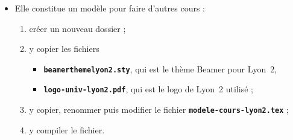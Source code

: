   \begin{itemize}
  \item Elle constitue un modèle pour faire d'autres cours :
    
    \begin{enumerate}
    \item créer un nouveau dossier ;
    \item y copier les fichiers 
      
      \begin{itemize}
      \item \texttt{\textbf{beamerthemelyon2.sty}}, qui est le thème Beamer pour Lyon~2,
      \item \texttt{\textbf{logo-univ-lyon2.pdf}}, qui est le logo de Lyon~2 utilisé ;
      \end{itemize}
      
    \item y copier, renommer puis modifier le fichier \texttt{\textbf{modele-cours-lyon2.tex}} ;
    \item y compiler le fichier.
    \end{enumerate}
  \end{itemize}
